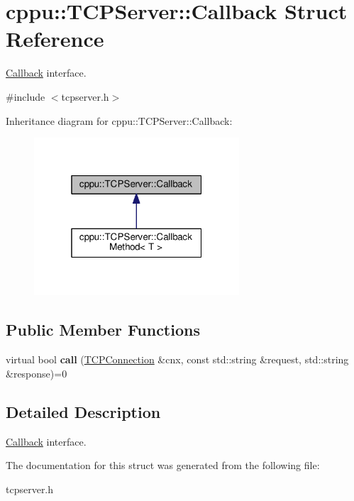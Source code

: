\hypertarget{structcppu_1_1TCPServer_1_1Callback}{}\section{cppu\+:\+:T\+C\+P\+Server\+:\+:Callback Struct Reference}
\label{structcppu_1_1TCPServer_1_1Callback}


\hyperlink{structcppu_1_1TCPServer_1_1Callback}{Callback} interface.  




{\ttfamily \#include $<$tcpserver.\+h$>$}



Inheritance diagram for cppu\+:\+:T\+C\+P\+Server\+:\+:Callback\+:\nopagebreak
\begin{figure}[H]
\begin{center}
\leavevmode
\includegraphics[width=217pt]{structcppu_1_1TCPServer_1_1Callback__inherit__graph}
\end{center}
\end{figure}
\subsection*{Public Member Functions}
\begin{DoxyCompactItemize}
\item 
virtual bool {\bfseries call} (\hyperlink{classcppu_1_1TCPConnection}{T\+C\+P\+Connection} \&cnx, const std\+::string \&request, std\+::string \&response)=0\hypertarget{structcppu_1_1TCPServer_1_1Callback_aabe4b0b30e14ddeb7c0c02aa3a335eba}{}\label{structcppu_1_1TCPServer_1_1Callback_aabe4b0b30e14ddeb7c0c02aa3a335eba}

\end{DoxyCompactItemize}


\subsection{Detailed Description}
\hyperlink{structcppu_1_1TCPServer_1_1Callback}{Callback} interface. 

The documentation for this struct was generated from the following file\+:\begin{DoxyCompactItemize}
\item 
tcpserver.\+h\end{DoxyCompactItemize}
